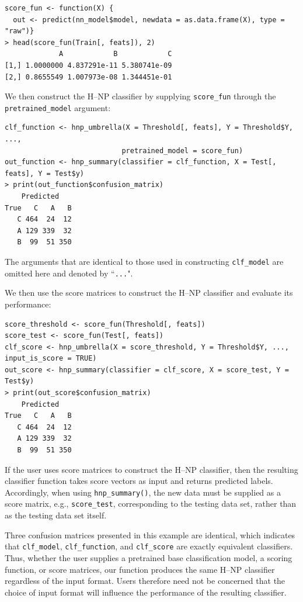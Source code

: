 \begin{verbatim}
score_fun <- function(X) {
  out <- predict(nn_model$model, newdata = as.data.frame(X), type = "raw")}
> head(score_fun(Train[, feats]), 2)
             A            B            C
[1,] 1.0000000 4.837291e-11 5.380741e-09
[2,] 0.8655549 1.007973e-08 1.344451e-01
\end{verbatim}
We then construct the H--NP classifier by supplying \texttt{score\_fun} through the \texttt{pretrained\_model} argument:
\begin{verbatim}
clf_function <- hnp_umbrella(X = Threshold[, feats], Y = Threshold$Y, ...,
                            pretrained_model = score_fun)
out_function <- hnp_summary(classifier = clf_function, X = Test[, feats], Y = Test$y)
> print(out_function$confusion_matrix)
    Predicted
True   C   A   B
   C 464  24  12
   A 129 339  32
   B  99  51 350
\end{verbatim}
The arguments that are identical to those used in constructing \texttt{clf\_model} are omitted here and denoted by ``\texttt{...}".

We then use the score matrices to construct the H--NP classifier and evaluate its performance:
\begin{verbatim}
score_threshold <- score_fun(Threshold[, feats])
score_test <- score_fun(Test[, feats])
clf_score <- hnp_umbrella(X = score_threshold, Y = Threshold$Y, ..., input_is_score = TRUE)
out_score <- hnp_summary(classifier = clf_score, X = score_test, Y = Test$y)
> print(out_score$confusion_matrix)
    Predicted
True   C   A   B
   C 464  24  12
   A 129 339  32
   B  99  51 350
\end{verbatim}
If the user uses score matrices to construct the H--NP classifier, then the resulting classifier function takes score vectors as input and returns predicted labels. Accordingly, when using \texttt{hnp\_summary()}, the new data must be supplied as a score matrix, e.g., \texttt{score\_test}, corresponding to the testing data set, rather than as the testing data set itself.

\begin{remark}
    Three confusion matrices presented in this example are identical, which indicates that \texttt{clf\_model}, \texttt{clf\_function}, and \texttt{clf\_score} are exactly equivalent classifiers. Thus, whether the user supplies a pretrained base classification model, a scoring function, or score matrices, our function produces the same H--NP classifier regardless of the input format. Users therefore need not be concerned that the choice of input format will influence the performance of the resulting classifier.
\end{remark}

